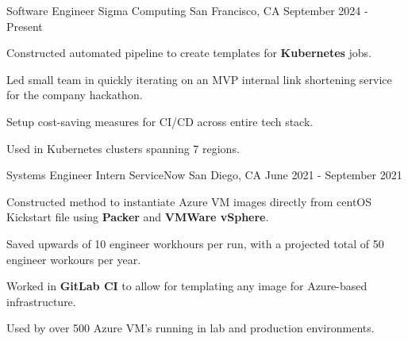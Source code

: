 \vspace{2mm}
\begin{cventries}
  \cventry
    {Software Engineer}
    {Sigma Computing}
    {San Francisco, CA}
    {September 2024 - Present}
    {
      \begin{cvitems}
        \item {Constructed automated pipeline to create templates for \textbf{Kubernetes} jobs.}
        \item {Led small team in quickly iterating on an MVP internal link shortening service for the company hackathon.}
        \item {Setup cost-saving measures for CI/CD across entire tech stack.}
        \item {Used in Kubernetes clusters spanning 7 regions.}
      \end{cvitems}
    }
    \vspace{6mm}
  \cventry
    {Systems Engineer Intern}
    {ServiceNow}
    {San Diego, CA}
    {June 2021 - September 2021}
    {
      \begin{cvitems}
        \item {Constructed method to instantiate Azure VM images directly from centOS Kickstart file using \textbf{Packer} and \textbf{VMWare vSphere}.}
        \item {Saved upwards of 10 engineer workhours per run, with a projected total of 50 engineer workours per year.}
        \item {Worked in \textbf{GitLab CI} to allow for templating any image for Azure-based infrastructure.}
        \item {Used by over 500 Azure VM's running in lab and production environments.}
      \end{cvitems}
}
\end{cventries}
